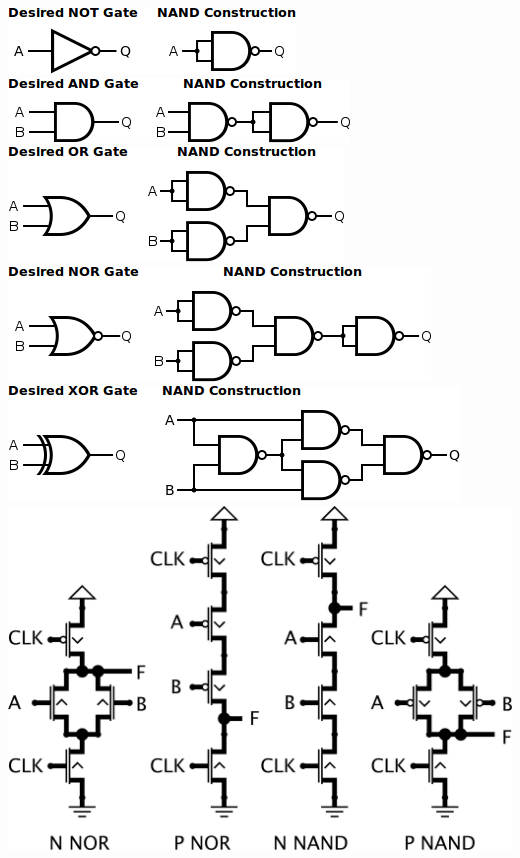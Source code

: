 \documentclass[9pt,fleqn]{article}
\begin{document}
\begin{multicols}{3}
    \includegraphics[width=\linewidth]{not.png}
    \includegraphics[width=\linewidth]{and.png}
    \includegraphics[width=\linewidth]{or.png}
    \includegraphics[width=\linewidth]{nor.png}
    \includegraphics[width=\linewidth]{xor.png}
    \includegraphics[width=\linewidth]{dynamic_gates.png}


\end{multicols}
\end{document}
